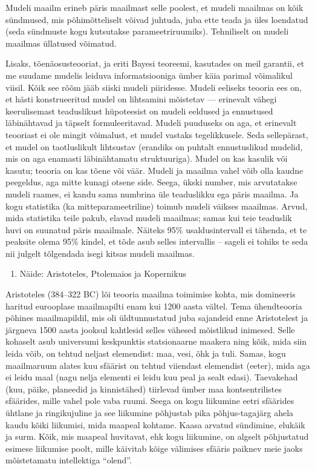 \documentclass[]{book}
\providecommand{\tightlist}{%
  \setlength{\itemsep}{0pt}\setlength{\parskip}{0pt}}
\begin{document}
Mudeli maailm erineb päris maailmast selle poolest, et mudeli maailmas
on kõik sündmused, mis põhimõtteliselt võivad juhtuda, juba ette teada
ja üles loendatud (seda sündmuste kogu kutsutakse parameetriruumiks).
Tehniliselt on mudeli maailmas üllatused võimatud.

Lisaks, tõenäosusteooriat, ja eriti Bayesi teoreemi, kasutades on meil
garantii, et me suudame mudelis leiduva informatsiooniga ümber käia
parimal võimalikul viisil. Kõik see rõõm jääb siiski mudeli piiridesse.
Mudeli eeliseks teooria ees on, et hästi konstrueeritud mudel on
lihtsamini mõistetav --- erinevalt vähegi keerulisemast teaduslikust
hüpoteesist on mudeli eeldused ja ennustused läbinähtavad ja täpselt
formuleeritavad. Mudeli puuduseks on aga, et erinevalt teooriast ei ole
mingit võimalust, et mudel vastaks tegelikkusele. Seda sellepärast, et
mudel on taotluslikult lihtsustav (erandiks on puhtalt ennustuslikud
mudelid, mis on aga enamasti läbinähtamatu struktuuriga). Mudel on kas
kasulik või kasutu; teooria on kas tõene või väär. Mudeli ja maailma
vahel võib olla kaudne peegeldus, aga mitte kunagi otsene side. Seega,
ükski number, mis arvutatakse mudeli raames, ei kandu sama numbrina üle
teaduslikku ega päris maailma. Ja kogu statistika (ka
mitteparameetriline) toimub mudeli väikses maailmas. Arvud, mida
statistika teile pakub, elavad mudeli maailmas; samas kui teie teaduslik
huvi on suunatud päris maailmale. Näiteks 95\% usaldusintervall ei
tähenda, et te peaksite olema 95\% kindel, et tõde asub selles
intervallis -- sageli ei tohiks te seda nii julgelt tõlgendada isegi
kitsas mudeli maailmas.

\begin{enumerate}
\def\labelenumi{(\arabic{enumi})}
\setcounter{enumi}{2}
\tightlist
\item
  Näide: Aristoteles, Ptolemaios ja Kopernikus
\end{enumerate}

Aristoteles (384--322 BC) lõi teooria maailma toimimise kohta, mis
domineeris haritud eurooplase maailmapilti enam kui 1200 aasta vältel.
Tema ühendteooria põhines maailmapildil, mis oli üldtunnustatud juba
sajandeid enne Aristotelest ja järgneva 1500 aasta jooksul kahtlesid
selles vähesed mõistlikud inimesed. Selle kohaselt asub universumi
keskpunktis statsionaarne maakera ning kõik, mida siin leida võib, on
tehtud neljast elemendist: maa, vesi, õhk ja tuli. Samas, kogu
maailmaruum alates kuu sfäärist on tehtud viiendast elemendist (eeter),
mida aga ei leidu maal (nagu nelja elementi ei leidu kuu peal ja sealt
edasi). Taevakehad (kuu, päike, planeedid ja kinnistähed) tiirlevad
ümber maa kontsentrilistes sfäärides, mille vahel pole vaba ruumi. Seega
on kogu liikumine eetri sfäärides ühtlane ja ringikujuline ja see
liikumine põhjustab pika põhjus-tagajärg ahela kaudu kõiki liikumisi,
mida maapeal kohtame. Kaasa arvatud sündimine, elukäik ja surm. Kõik,
mis maapeal huvitavat, ehk kogu liikumine, on algselt põhjustatud
esimese liikumise poolt, mille käivitab kõige välimises sfääris paiknev
meie jaoks mõistetamatu intellektiga ``olend''.
\end{document}
